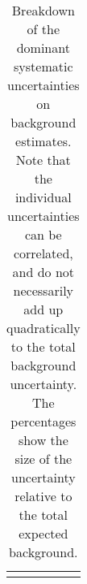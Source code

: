 \begin{table}
\begin{center}
\begin{tabular*}{\textwidth}{@{\extracolsep{\fill}}lcc}
\noalign{\smallskip}\hline\noalign{\smallskip}
\end{tabular*}
\end{center}
\caption[Breakdown of uncertainty on background estimates]{
Breakdown of the dominant systematic uncertainties on background estimates.
Note that the individual uncertainties can be correlated, and do not necessarily add up quadratically to 
the total background uncertainty. The percentages show the size of the uncertainty relative to the total expected background.
\label{table.results.bkgestimate.uncertainties.SRC4_SRC5}}
\end{table}
%
